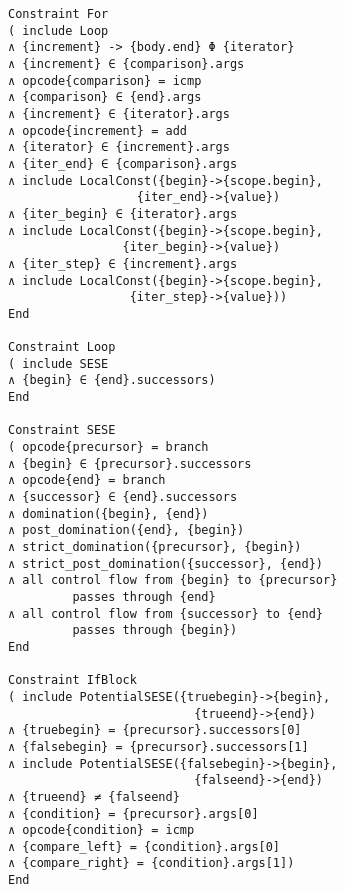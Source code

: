\begin{figure}[p]
\begin{lstlisting}[language=CAnDL,basicstyle=\linespread{0.8}\ttfamily,
                   firstnumber=88]
Constraint For
( include Loop
∧ {increment} -> {body.end} Φ {iterator}
∧ {increment} ∈ {comparison}.args
∧ opcode{comparison} = icmp
∧ {comparison} ∈ {end}.args
∧ {increment} ∈ {iterator}.args
∧ opcode{increment} = add
∧ {iterator} ∈ {increment}.args
∧ {iter_end} ∈ {comparison}.args
∧ include LocalConst({begin}->{scope.begin},
                  {iter_end}->{value})
∧ {iter_begin} ∈ {iterator}.args
∧ include LocalConst({begin}->{scope.begin},
                {iter_begin}->{value})
∧ {iter_step} ∈ {increment}.args
∧ include LocalConst({begin}->{scope.begin},
                 {iter_step}->{value}))
End

Constraint Loop
( include SESE
∧ {begin} ∈ {end}.successors)
End

Constraint SESE
( opcode{precursor} = branch
∧ {begin} ∈ {precursor}.successors
∧ opcode{end} = branch
∧ {successor} ∈ {end}.successors
∧ domination({begin}, {end})
∧ post_domination({end}, {begin})
∧ strict_domination({precursor}, {begin})
∧ strict_post_domination({successor}, {end})
∧ all control flow from {begin} to {precursor}
         passes through {end}
∧ all control flow from {successor} to {end}
         passes through {begin})
End

Constraint IfBlock
( include PotentialSESE({truebegin}->{begin},
                          {trueend}->{end})
∧ {truebegin} = {precursor}.successors[0]
∧ {falsebegin} = {precursor}.successors[1]
∧ include PotentialSESE({falsebegin}->{begin},
                          {falseend}->{end})
∧ {trueend} ≠ {falseend}
∧ {condition} = {precursor}.args[0]
∧ opcode{condition} = icmp
∧ {compare_left} = {condition}.args[0]
∧ {compare_right} = {condition}.args[1])
End
\end{lstlisting}
\end{figure}
